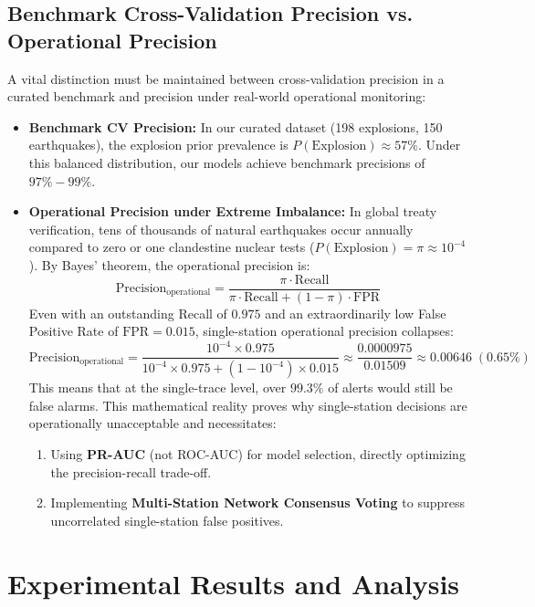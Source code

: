 \documentclass[11pt,a4paper]{article}
\begin{document}
\subsection{Benchmark Cross-Validation Precision vs. Operational Precision}
A vital distinction must be maintained between cross-validation precision in a curated benchmark and precision under real-world operational monitoring:
\begin{itemize}
    \item \textbf{Benchmark CV Precision:} In our curated dataset (198 explosions, 150 earthquakes), the explosion prior prevalence is $P(\text{Explosion}) \approx 57\%$. Under this balanced distribution, our models achieve benchmark precisions of $97\% - 99\%$.
    \item \textbf{Operational Precision under Extreme Imbalance:} In global treaty verification, tens of thousands of natural earthquakes occur annually compared to zero or one clandestine nuclear tests ($P(\text{Explosion}) = \pi \approx 10^{-4}$). By Bayes' theorem, the operational precision is:
    \begin{equation*}
        \text{Precision}_{\text{operational}} = \frac{\pi \cdot \text{Recall}}{\pi \cdot \text{Recall} + (1 - \pi) \cdot \text{FPR}}
    \end{equation*}
    Even with an outstanding Recall of $0.975$ and an extraordinarily low False Positive Rate of $\text{FPR} = 0.015$, single-station operational precision collapses:
    \begin{equation*}
        \text{Precision}_{\text{operational}} = \frac{10^{-4} \times 0.975}{10^{-4} \times 0.975 + (1 - 10^{-4}) \times 0.015} \approx \frac{0.0000975}{0.01509} \approx 0.00646 \; (0.65\%)
    \end{equation*}
    This means that at the single-trace level, over $99.3\%$ of alerts would still be false alarms. This mathematical reality proves why single-station decisions are operationally unacceptable and necessitates:
    \begin{enumerate}
        \item Using \textbf{PR-AUC} (not ROC-AUC) for model selection, directly optimizing the precision-recall trade-off.
        \item Implementing \textbf{Multi-Station Network Consensus Voting} to suppress uncorrelated single-station false positives.
    \end{enumerate}
\end{itemize}


\section{Experimental Results and Analysis}
\end{document}
